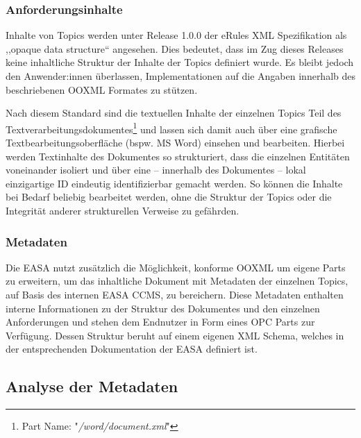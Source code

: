 \subsubsection{Anforderungsinhalte}

    Inhalte von Topics werden unter Release 1.0.0 der eRules \ac{XML} Spezifikation als ,,opaque data structure`` angesehen.
    Dies bedeutet, dass im Zug dieses Releases keine inhaltliche Struktur der Inhalte der Topics definiert wurde.
    Es bleibt jedoch den Anwender:innen überlassen, Implementationen auf die Angaben innerhalb des beschriebenen \acs{OOXML} Formates zu stützen.
    \cite[6]{easa_xml_doc}

    Nach diesem Standard sind die textuellen Inhalte der einzelnen Topics Teil des Textverarbeitungsdokumentes\footnote{Part Name: "\textit{/word/document.xml}"} und lassen sich damit auch über eine grafische Textbearbeitungsoberfläche (bspw. \ac{MS} Word) einsehen und bearbeiten.
    Hierbei werden Textinhalte des Dokumentes so strukturiert, dass die einzelnen Entitäten voneinander isoliert und über eine -- innerhalb des Dokumentes -- lokal einzigartige ID eindeutig identifizierbar gemacht werden.
    So können die Inhalte bei Bedarf beliebig bearbeitet werden, ohne die Struktur der Topics oder die Integrität anderer strukturellen Verweise zu gefährden.

\subsubsection{Metadaten}

    Die \ac{EASA} nutzt zusätzlich die Möglichkeit, konforme \ac{OOXML} um eigene Parts zu erweitern, um das inhaltliche Dokument mit Metadaten der einzelnen Topics, auf Basis des internen \ac{EASA} \ac{CCMS}, zu bereichern.
    Diese Metadaten enthalten interne Informationen zu der Struktur des Dokumentes und den einzelnen Anforderungen und stehen dem Endnutzer in Form eines \ac{OPC} Parts  zur Verfügung.
    Dessen Struktur beruht auf einem eigenen \ac{XML} Schema, welches in der entsprechenden Dokumentation der \ac{EASA} definiert ist.

\pagebreak
\subsection{Analyse der Metadaten}
\label{ch:easa_anal}


